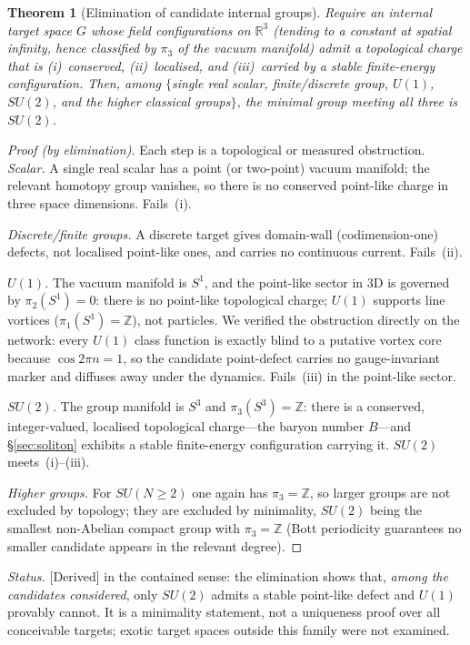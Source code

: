 \documentclass[aps,prd,reprint,nofootinbib,superscriptaddress,floatfix]{revtex4-2}
\theoremstyle{plain}
\newtheorem{theorem}{Theorem}
\newcommand{\Sderiv}{\textsf{[Derived]}}
\newcommand{\su}[1]{SU(#1)}
\begin{document}
\begin{theorem}[Elimination of candidate internal groups]\label{thm:elim}
Require an internal target space $G$ whose field configurations on $\mathbb{R}^3$
(tending to a constant at spatial infinity, hence classified by $\pi_3$ of the vacuum
manifold) admit a topological charge that is \textup{(i)}~conserved,
\textup{(ii)}~localised, and \textup{(iii)}~carried by a stable finite-energy
configuration. Then, among $\{$single real scalar, finite/discrete group, $U(1)$,
$\su2$, and the higher classical groups$\}$, the minimal group meeting all three is
$\su2$.
\end{theorem}

\begin{proof}[Proof (by elimination)]
Each step is a topological or measured obstruction.
\emph{Scalar.} A single real scalar has a point (or two-point) vacuum manifold; the
relevant homotopy group vanishes, so there is no conserved point-like charge in three
space dimensions. Fails~(i).

\emph{Discrete/finite groups.} A discrete target gives domain-wall (codimension-one)
defects, not localised point-like ones, and carries no continuous current. Fails~(ii).

\emph{$U(1)$.} The vacuum manifold is $S^1$, and the point-like sector in $3$D is
governed by $\pi_2(S^1)=0$: there is no point-like topological charge; $U(1)$ supports
line vortices ($\pi_1(S^1)=\mathbb{Z}$), not particles. We verified the obstruction
directly on the network: every $U(1)$ class function is exactly blind to a putative
vortex core because $\cos2\pi n=1$, so the candidate point-defect carries no
gauge-invariant marker and diffuses away under the dynamics. Fails~(iii) in the
point-like sector.

\emph{$\su2$.} The group manifold is $S^3$ and $\pi_3(S^3)=\mathbb{Z}$: there is a
conserved, integer-valued, localised topological charge---the baryon number $B$---and
\S\ref{sec:soliton} exhibits a stable finite-energy configuration carrying it. $\su2$
meets~(i)--(iii).

\emph{Higher groups.} For $SU(N\ge2)$ one again has $\pi_3=\mathbb{Z}$, so larger
groups are not excluded by topology; they are excluded by minimality, $\su2$ being the
smallest non-Abelian compact group with $\pi_3=\mathbb{Z}$ (Bott periodicity
guarantees no smaller candidate appears in the relevant degree).
\end{proof}

\emph{Status.} \Sderiv{} in the contained sense: the elimination shows that,
\emph{among the candidates considered}, only $\su2$ admits a stable point-like defect
and $U(1)$ provably cannot. It is a minimality statement, not a uniqueness proof over
all conceivable targets; exotic target spaces outside this family were not examined.
\end{document}
